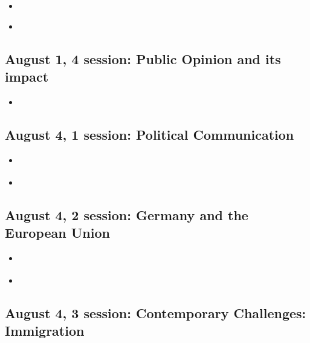 \documentclass[11p,a4]{article}
\begin{document}
		\begin{itemize}
            \item \citet[Chapter 7]{grotz2023political} 
		    \item \citet{Klüver03042015}  
		\end{itemize}
				
\subsection*{August 1, 4 session: Public Opinion and its impact}				
				
\begin{itemize}
    \item \citet{Metag2016}
\end{itemize}

				
\subsection*{August 4, 1 session: Political Communication}
				
				\begin{itemize}
				     \item \citet[Chapter 8]{grotz2023political} 
\item \citet{Datts01102024}
				\end{itemize}
				
\subsection*{August 4, 2 session: Germany and the European Union}				
				
				\begin{itemize}
                   \item \citet[Chapter 3]{grotz2023political} 
				    \item \citet{Wonka&Haunss2020}
				\end{itemize}
				
\subsection*{August 4, 3 session: Contemporary Challenges: Immigration}
				
\end{document}
